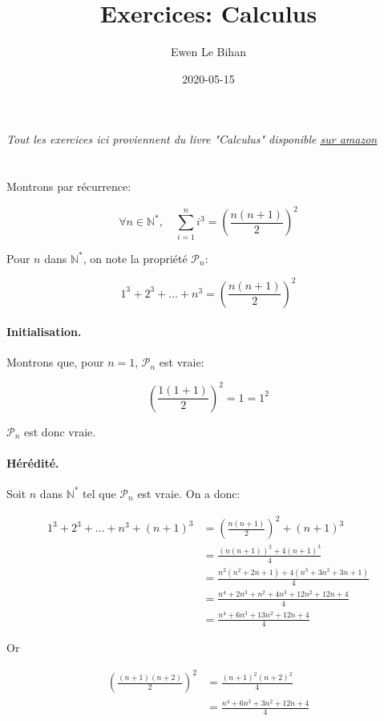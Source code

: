 \documentclass{article}
\title{Exercices: Calculus}
\author{Ewen Le Bihan}
\date{2020-05-15}
\newcommand{\N}{\mathds{N}}
\newcommand{\spliteq}[1]{\begin{equation*}\begin{split}#1\end{split}\end{equation*}}
\begin{document}
\maketitle

\begin{center}
	\emph{Tout les exercices ici proviennent du livre "Calculus" disponible 
	\href{https://www.amazon.fr/Calculus-\%C3\%A9dition-approfondir-connaissances-math\%C3\%A9matiques/dp/2820807178/}{\underline{sur amazon}}}
\end{center}
\section{} %

Montrons par récurrence:

\[
	\forall n \in \N^\ast, \quad \sum_{i=1}^{n} i^3 = \left( \frac{n(n+1)}{2} \right)^2
\]

Pour $n$ dans $\N^\ast$, on note la propriété $\mathcal{P}_n$:

\[
	1^3 + 2^3 + \dots + n^3 = \left( \frac{n(n+1)}{2} \right)^2	
\]

\paragraph{Initialisation.} Montrons que, pour $n = 1$, $\mathcal{P}_n$ est vraie:

\[
	\left(\frac{1(1+1)}{2}\right)^2 = 1 = 1^2
\]

$\mathcal{P}_n$ est donc vraie.

\paragraph{Hérédité.} Soit $n$ dans $\N^\ast$ tel que $\mathcal{P}_n$ est vraie. 
On a donc:

\spliteq{
	1^3 + 2^3 + \dots + n^3 + (n+1)^3 &= \left( \frac{n(n+1)}{2} \right)^2 + (n+1)^3 \\
					  &= \frac{(n(n+1))^2 + 4(n+1)^3}{4} \\
					  &= \frac{n^2(n^2+2n+1) + 4(n^3+3n^2+3n+1)}{4} \\
					  &= \frac{n^4+2n^3+n^2+4n^3+12n^2+12n+4}{4} \\
					  &= \frac{n^4+6n^3+13n^2+12n+4}{4}
}

Or

\spliteq{
	\left( \frac{(n+1)(n+2)}{2} \right)^2 &= \frac{(n+1)^2(n+2)^2}{4} \\
					      &= \frac{n^4+6n^3+3n^2+12n+4}{4}
}
\end{document}
